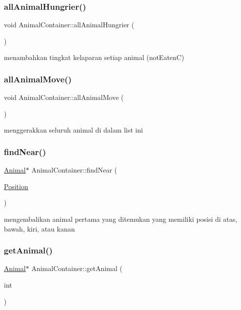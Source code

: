 \subsubsection{\texorpdfstring{allAnimalHungrier()}{allAnimalHungrier()}}
{\footnotesize\ttfamily void Animal\+Container\+::all\+Animal\+Hungrier (\begin{DoxyParamCaption}{ }\end{DoxyParamCaption})}

menambahkan tingkat kelaparan setiap animal (not\+EatenC) \mbox{\label{class_animal_container_a1df23ab6e16f8be97df230b5b632af6c}} 
\subsubsection{\texorpdfstring{allAnimalMove()}{allAnimalMove()}}
{\footnotesize\ttfamily void Animal\+Container\+::all\+Animal\+Move (\begin{DoxyParamCaption}{ }\end{DoxyParamCaption})}

menggerakkan seluruh animal di dalam list ini \mbox{\label{class_animal_container_aac13ed7fa4e1ce07e98d1152012d50b2}} 
\subsubsection{\texorpdfstring{findNear()}{findNear()}}
{\footnotesize\ttfamily \mbox{\hyperlink{class_animal}{Animal}}$\ast$ Animal\+Container\+::find\+Near (\begin{DoxyParamCaption}\item[{\mbox{\hyperlink{class_position}{Position}}}]{ }\end{DoxyParamCaption})}

mengembalikan animal pertama yang ditemukan yang memiliki posisi di atas, bawah, kiri, atau kanan \mbox{\label{class_animal_container_a6bba409e3e4b31e65134b1efd6910a3e}} 
\subsubsection{\texorpdfstring{getAnimal()}{getAnimal()}}
{\footnotesize\ttfamily \mbox{\hyperlink{class_animal}{Animal}}$\ast$ Animal\+Container\+::get\+Animal (\begin{DoxyParamCaption}\item[{int}]{ }\end{DoxyParamCaption})}

